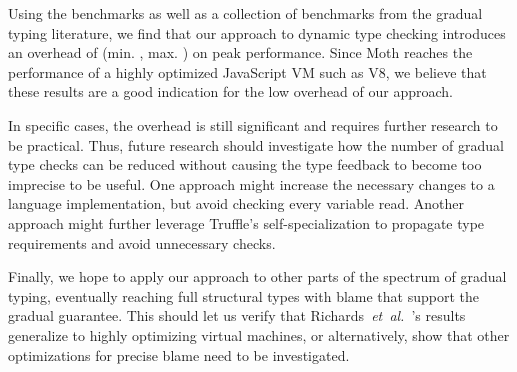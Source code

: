 Using the \AWFY benchmarks as well as a collection of benchmarks from the
gradual typing literature, we find that our approach to dynamic type checking
introduces an overhead of 
\OverheadTypingGMeanP (min. \OverheadTypingMinP, max. \OverheadTypingMaxP)
on peak performance.
Since Moth reaches the performance of a
highly optimized JavaScript VM such as V8,
we believe that these results are a good indication
for the low overhead of our approach.


In specific cases, the overhead is still significant and requires further
research to be practical. Thus, future research should investigate how the
number of gradual type checks can be reduced without causing
the type feedback to become too imprecise to be useful.
One approach might increase the necessary changes to a language implementation,
but avoid checking every variable read.
Another approach might further leverage Truffle's self-specialization
to propagate type requirements and avoid unnecessary checks.

Finally, we hope to apply our approach to other parts of the spectrum
of gradual typing, eventually reaching 
full structural types with
blame that support the gradual guarantee.  
This should let us verify that
Richards~\textit{et~al.}~\cite{Richards2017}'s results generalize to highly optimizing virtual
machines, or alternatively, show that other optimizations for precise
blame need to be investigated.

